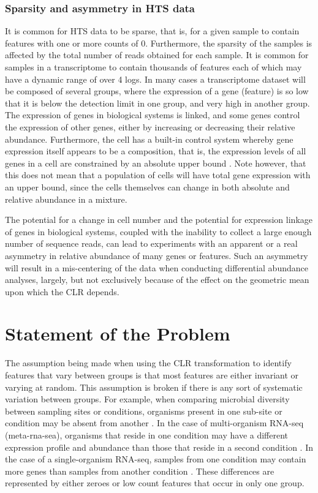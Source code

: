 \documentclass [10pt]{article}
\begin{document}
\subsubsection{Sparsity and asymmetry in HTS data}
\vskip-0.25cm
It is common for HTS data to be sparse, that is, for a given sample to contain features with one or more counts of 0. Furthermore, the sparsity of the samples is affected by the total number of reads obtained for each sample. It is common for samples in a transcriptome to contain thousands of features each of which may have a dynamic range of over 4 logs. In many cases a transcriptome dataset will be composed of several groups, where the expression of a gene (feature) is so low that it is below the detection limit in one group, and very high in another group. The expression of genes in biological systems is linked, and some genes control the expression of other genes, either by increasing or decreasing their relative abundance. Furthermore, the cell has a built-in control system whereby gene expression itself appears to be a composition, that is, the expression levels of all genes in a cell are constrained by an absolute upper bound  . Note however, that this does not mean that a population of cells will have total gene expression with an upper bound, since the cells themselves can change in both absolute and relative abundance in a mixture. 

The potential for a change in cell number and the potential for expression linkage of genes in biological systems, coupled with the inability to collect a large enough number of sequence reads, can lead to experiments with an apparent or a real asymmetry in relative abundance of many genes or features. Such an asymmetry will result in a mis-centering of the data when conducting differential abundance analyses, largely, but not exclusively because of the effect on the geometric mean upon which the CLR depends. 

\section{Statement of the Problem}
\vskip-0.25cm

The assumption being made when using the CLR transformation to identify features that vary between groups is that most features are either invariant or varying at random. This assumption is broken if there is any sort of systematic variation between groups. For example, when comparing microbial diversity between sampling sites or conditions, organisms present in one sub-site or condition may be absent from another \cite{Macklaim:2015aa,Hummelen:2010,Gajer:2012}. In the case of multi-organism RNA-seq (meta-rna-sea), organisms that reside in one condition may have a different expression profile and abundance than those that reside in a second condition \cite{macklaim:2013}. In the case of a single-organism RNA-seq, samples from one condition may contain more genes than samples from another condition \cite{Lang:2015aa,Peng:2014aa,Zhao:2013aa}. These differences are represented by either zeroes or low count features that occur in only one group. 
\end{document}
